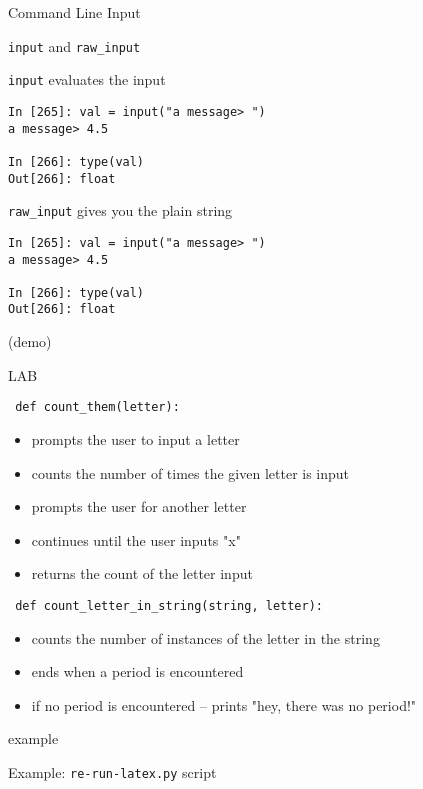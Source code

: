 \documentclass{beamer}
\begin{document}
\begin{frame}[fragile]{Command Line Input}

{\Large \verb|input| and \verb|raw_input|}

{\Large \verb|input| evaluates the input}
\begin{verbatim}
In [265]: val = input("a message> ")
a message> 4.5

In [266]: type(val)
Out[266]: float
\end{verbatim}

{\Large \verb|raw_input| gives you the plain string}
\begin{verbatim}
In [265]: val = input("a message> ")
a message> 4.5

In [266]: type(val)
Out[266]: float
\end{verbatim}
(demo)
\end{frame}


\begin{frame}[fragile]{LAB}

\verb| def count_them(letter): |
\begin{itemize}
  \item prompts the user to input a letter
  \item counts the number of times the given letter is input
  \item prompts the user for another letter
  \item continues until the user inputs "x"
  \item returns the count of the letter input
\end{itemize}

\verb| def count_letter_in_string(string, letter): |
\begin{itemize}
  \item counts the number of instances of the letter in the string
  \item ends when a period is encountered
  \item if no period is encountered -- prints "hey, there was no period!"
\end{itemize}
\end{frame}

\begin{frame}[fragile]{example}

\Large{Example: \verb|re-run-latex.py| script}

\end{frame}
\end{document}
